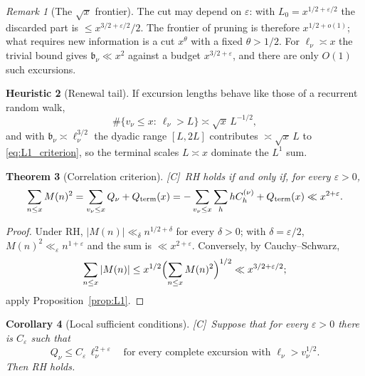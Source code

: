 \documentclass[11pt]{amsart}
\numberwithin{equation}{section}
\theoremstyle{plain}
\newtheorem{theorem}{Theorem}[section]
\newtheorem{corollary}[theorem]{Corollary}
\theoremstyle{definition}
\newtheorem{heuristic}[theorem]{Heuristic}
\theoremstyle{remark}
\newtheorem{remark}[theorem]{Remark}
\newcommand{\eps}{\varepsilon}
\newcommand{\tagC}{\textup{[C]}}
\begin{document}
\begin{remark}[The $\sqrt{x}$ frontier]
\label{rem:sqrt_frontier}
The cut may depend on $\eps$: with $L_0=x^{1/2+\eps/2}$ the discarded part is
$\le x^{3/2+\eps/2}/2$. The frontier of pruning is therefore $x^{1/2+o(1)}$;
what requires new information is a cut $x^{\theta}$ with a fixed
$\theta>1/2$. For $\ell_\nu\asymp x$ the trivial bound gives
$\mathfrak b_\nu\ll x^2$ against a budget $x^{3/2+\eps}$, and there are only
$O(1)$ such excursions.
\end{remark}

\begin{heuristic}[Renewal tail]
\label{heu:renewal}
If excursion lengths behave like those of a recurrent random walk,
\begin{equation}
\label{eq:renewal_tail}
  \#\{v_\nu\le x:\ \ell_\nu>L\}\asymp\sqrt{x}\,L^{-1/2},
\end{equation}
and with $\mathfrak b_\nu\asymp\ell_\nu^{3/2}$ the dyadic range $[L,2L]$
contributes $\asymp\sqrt{x}\,L$ to \eqref{eq:L1_criterion}, so the terminal
scales $L\asymp x$ dominate the $L^1$ sum.
\end{heuristic}

\begin{theorem}[Correlation criterion]
\label{thm:corr-criterion}
\tagC\ RH holds if and only if, for every $\eps>0$,
\begin{equation}
\label{eq:RH-corr}
  \sum_{n\le x}M(n)^2=\sum_{v_\nu\le x}Q_\nu+Q_{\rm term}(x)
  =-\sum_{v_\nu\le x}\sum_{h}hC^{(\nu)}_h+Q_{\rm term}(x)\ll x^{2+\eps}.
\end{equation}
\end{theorem}

\begin{proof}
Under RH, $|M(n)|\ll_\delta n^{1/2+\delta}$ for every $\delta>0$; with
$\delta=\eps/2$, $M(n)^2\ll_\eps n^{1+\eps}$ and the sum is $\ll x^{2+\eps}$.
Conversely, by Cauchy--Schwarz,
\[
\sum_{n\le x}|M(n)|\le x^{1/2}\Bigl(\sum_{n\le x}M(n)^2\Bigr)^{1/2}\ll x^{3/2+\eps/2};
\]
apply
Proposition~\ref{prop:L1}.
\end{proof}

\begin{corollary}[Local sufficient conditions]
\label{cor:local-corr-sufficient}
\tagC\ Suppose that for every $\eps>0$ there is $C_\eps$ such that
\begin{equation}
\label{eq:pruned_Q}
  Q_\nu\le C_\eps\,\ell_\nu^{2+\eps}\quad\text{for every complete excursion with }
  \ell_\nu>v_\nu^{1/2}.
\end{equation}
Then RH holds.
\end{corollary}
\end{document}
